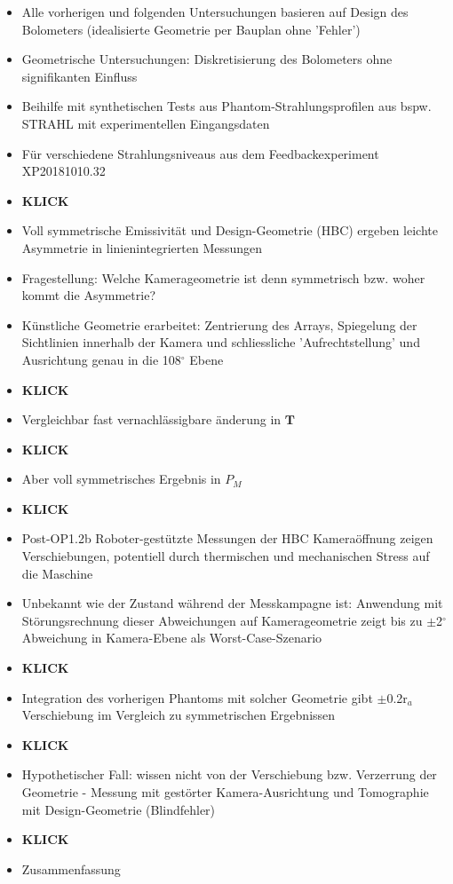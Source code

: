 \documentclass[11pt,a4paper]{article}
\begin{document}
\begin{itemize}
\item Alle vorherigen und folgenden Untersuchungen basieren auf Design des Bolometers (idealisierte Geometrie per Bauplan ohne 'Fehler')
\item Geometrische Untersuchungen: Diskretisierung des Bolometers ohne signifikanten Einfluss
\item Beihilfe mit synthetischen Tests aus Phantom-Strahlungsprofilen aus bspw. STRAHL mit experimentellen Eingangsdaten
\item Für verschiedene Strahlungsniveaus aus dem Feedbackexperiment XP20181010.32
\item \textbf{KLICK}
\item Voll symmetrische Emissivität und Design-Geometrie (HBC) ergeben leichte Asymmetrie in linienintegrierten Messungen
\item Fragestellung: Welche Kamerageometrie ist denn symmetrisch bzw. woher kommt die Asymmetrie?
\item Künstliche Geometrie erarbeitet: Zentrierung des Arrays, Spiegelung der Sichtlinien innerhalb der Kamera und schliessliche 'Aufrechtstellung' und Ausrichtung genau in die 108$^\circ$ Ebene
\item \textbf{KLICK}
\item Vergleichbar fast vernachlässigbare änderung in $\mathbf{T}$
\item \textbf{KLICK}
\item Aber voll symmetrisches Ergebnis in $P_{M}$
\item \textbf{KLICK}
\item Post-OP1.2b Roboter-gestützte Messungen der HBC Kameraöffnung zeigen Verschiebungen, potentiell durch thermischen und mechanischen Stress auf die Maschine
\item Unbekannt wie der Zustand während der Messkampagne ist: Anwendung mit Störungsrechnung dieser Abweichungen auf Kamerageometrie zeigt bis zu $\pm$2$^{\circ}$ Abweichung in Kamera-Ebene als Worst-Case-Szenario
\item \textbf{KLICK}
\item Integration des vorherigen Phantoms mit solcher Geometrie gibt $\pm$0.2r$_{a}$ Verschiebung im Vergleich zu symmetrischen Ergebnissen
\item \textbf{KLICK}
\item Hypothetischer Fall: wissen nicht von der Verschiebung bzw. Verzerrung der Geometrie - Messung mit gestörter Kamera-Ausrichtung und Tomographie mit Design-Geometrie (Blindfehler)
\item \textbf{KLICK}
\item Zusammenfassung
\end{itemize}
\end{document}
